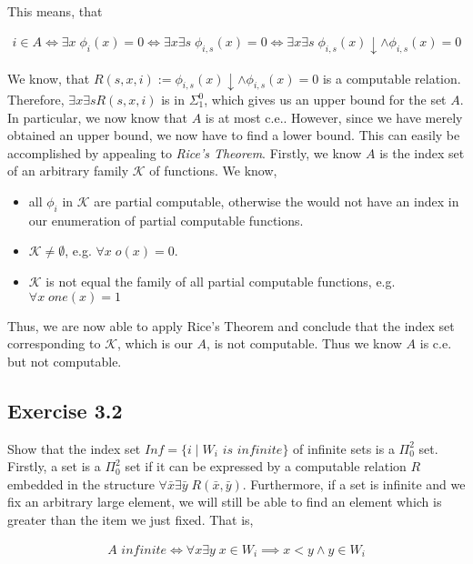 \documentclass[11pt,a4paper]{article}
\begin{document}
This means, that 

\begin{equation*}
\begin{split}
i \in A \iff \exists x \; \phi_i(x)=0 \iff \exists x \exists s \; \phi_{i,s}(x)=0 
\iff \exists x \exists s \; \phi_{i,s}(x)\downarrow \wedge \phi_{i,s}(x) = 0
\end{split}
\end{equation*}

We know, that $R(s,x,i):=\phi_{i,s}(x)\downarrow \wedge \phi_{i,s}(x) = 0$ is a computable relation. 
Therefore, $\exists x \exists s R(s,x,i)$ is in $\Sigma_1^0$, which gives us an upper bound for the set $A$. 
In particular, we now know that $A$ is at most c.e..
However, since we have merely obtained an upper bound, we now have to find a lower bound.
This can easily be accomplished by appealing to \emph{Rice's Theorem}.
Firstly, we know $A$ is the index set of an arbitrary family $\mathcal{K}$ of functions. 
We know,
\begin{itemize}
\item all $\phi_i$ in $\mathcal{K}$ are partial computable, otherwise the would not have an index in our enumeration of partial computable functions.
\item $\mathcal{K} \neq \emptyset$, e.g. $\forall x \; o(x)=0$.
\item $\mathcal{K}$ is not equal the family of all partial computable functions, e.g. $\forall x \; one(x)=1$
\end{itemize}
Thus, we are now able to apply Rice's Theorem and conclude that the index set corresponding to  $\mathcal{K}$, 
which is our $A$, is not computable. Thus we know $A$ is c.e. but not computable.

\subsection*{Exercise 3.2}

Show that the index set $Inf = \{i \mid W_i \textit{ is infinite}\}$ of infinite sets is a $\Pi_0^2$ set.
Firstly, a set is a $\Pi_0^2$ set if it can be expressed by a computable relation $R$ embedded in the structure 
$\forall \bar{x} \exists \bar{y} \; R(\bar{x},\bar{y})$. Furthermore, if a set is infinite and we fix an arbitrary large element, 
we will still be able to find an element which is greater than the item we just fixed. That is, 

\begin{equation*}
\begin{split}
A \textit{ infinite} \iff \forall x \exists y \; x \in W_i  \implies x<y \wedge y \in W_i
\end{split}
\end{equation*}
\end{document}
